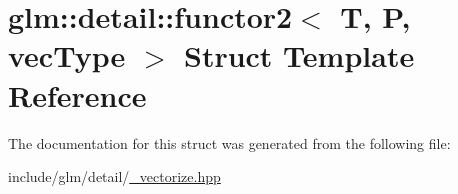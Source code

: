 \hypertarget{structglm_1_1detail_1_1functor2}{}\section{glm\+:\+:detail\+:\+:functor2$<$ T, P, vec\+Type $>$ Struct Template Reference}
\label{structglm_1_1detail_1_1functor2}


The documentation for this struct was generated from the following file\+:\begin{DoxyCompactItemize}
\item 
include/glm/detail/\hyperlink{__vectorize_8hpp}{\+\_\+vectorize.\+hpp}\end{DoxyCompactItemize}
